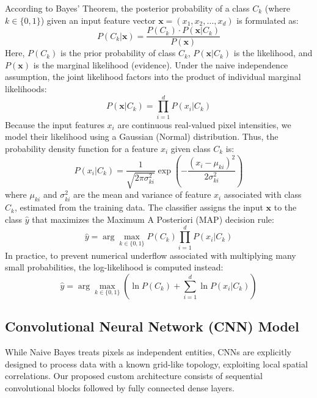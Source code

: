 \documentclass[conference]{IEEEtran}
\begin{document}
According to Bayes' Theorem, the posterior probability of a class $C_k$ (where $k \in \{0, 1\}$) given an input feature vector $\mathbf{x} = (x_1, x_2, \dots, x_d)$ is formulated as:
\begin{equation}
    P(C_k | \mathbf{x}) = \frac{P(C_k) \cdot P(\mathbf{x} | C_k)}{P(\mathbf{x})}
\end{equation}
Here, $P(C_k)$ is the prior probability of class $C_k$, $P(\mathbf{x} | C_k)$ is the likelihood, and $P(\mathbf{x})$ is the marginal likelihood (evidence). Under the naive independence assumption, the joint likelihood factors into the product of individual marginal likelihoods:
\begin{equation}
    P(\mathbf{x} | C_k) = \prod_{i=1}^{d} P(x_i | C_k)
\end{equation}
Because the input features $x_i$ are continuous real-valued pixel intensities, we model their likelihood using a Gaussian (Normal) distribution. Thus, the probability density function for a feature $x_i$ given class $C_k$ is:
\begin{equation}
    P(x_i | C_k) = \frac{1}{\sqrt{2\pi\sigma_{ki}^2}} \exp\left( - \frac{(x_i - \mu_{ki})^2}{2\sigma_{ki}^2} \right)
\end{equation}
where $\mu_{ki}$ and $\sigma_{ki}^2$ are the mean and variance of feature $x_i$ associated with class $C_k$, estimated from the training data. The classifier assigns the input $\mathbf{x}$ to the class $\hat{y}$ that maximizes the Maximum A Posteriori (MAP) decision rule:
\begin{equation}
    \hat{y} = \arg\max_{k \in \{0, 1\}} P(C_k) \prod_{i=1}^{d} P(x_i | C_k)
\end{equation}
In practice, to prevent numerical underflow associated with multiplying many small probabilities, the log-likelihood is computed instead:
\begin{equation}
    \hat{y} = \arg\max_{k \in \{0, 1\}} \left( \ln P(C_k) + \sum_{i=1}^{d} \ln P(x_i | C_k) \right)
\end{equation}

\subsection{Convolutional Neural Network (CNN) Model}
While Naive Bayes treats pixels as independent entities, CNNs are explicitly designed to process data with a known grid-like topology, exploiting local spatial correlations. Our proposed custom architecture consists of sequential convolutional blocks followed by fully connected dense layers.
\end{document}
